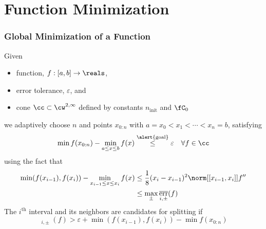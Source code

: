 \documentclass[12pt,compress,xcolor={usenames,dvipsnames}]{beamer} %
\DeclareMathOperator{\init}{init}
\DeclareMathOperator{\oerr}{\overline{err}}
\begin{document}
\section{Function Minimization}
\begin{frame}
	\frametitle{Global Minimization of a Function}
		\vspace{-4ex}
		
		Given 
		
		\vspace{-3ex}
		\begin{itemize}
			\item \alert{function}, $f:[a,b] \to \reals$, 
			\item \alert{error tolerance}, $\varepsilon$, and 
			\item \alert{cone} $\cc \subset \cw^{2,\infty}$ defined by constants $n_{\init}$ and $\fC_0$
		\end{itemize}
		\vspace{-3ex}
		we \alert{adaptively} choose $n$ and points $x_{0:n}$ with $a = x_0 <x_1 < \cdots < x_n = b$, satisfying
		\begin{equation*}
		\min f(x_{0:n}) - \min_{a \le x \le b} f(x)  \overset{\text{\alert{goal}}}{\le} \varepsilon \quad \forall f \in \cc 
		\end{equation*}
	using the fact that
	\begin{align*}
	\min(f(x_{i-1}), f(x_i)) - \min_{x_{i-1} \le x \le x_i} f(x) & \le \frac{1}{8}(x_{i}-x_{i-1})^2\norm[{[x_{i-1},x_i]}]{f''} \\
	& \le \max_{\pm} \oerr_{i,\pm}(f)
	\end{align*}
	The $i^{\text{th}}$ interval and its neighbors are candidates for splitting if 
	\[
	\oerr_{i,\pm}(f) > \varepsilon + \min(f(x_{i-1}), f(x_i)) - \min f(x_{0:n})
	\]
		
\end{frame}
\end{document}

